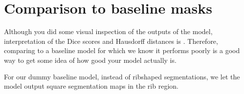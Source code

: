 \documentclass[letterpaper,10pt,english]{jupyterBook}
\begin{document}
\section{Comparison to baseline masks}
\label{\detokenize{notebooks/Tutorial3_Segmentation/Tutorial3_Segmentation_student:comparison-to-baseline-masks}}
\sphinxAtStartPar
Although you did some visual inspection of the outputs of the model, interpretation of the Dice scores and Hausdorff distances is . Therefore, comparing to a baseline model for which we know it performs poorly is a good way to get some idea of how good your model actually is.

\sphinxAtStartPar
For our dummy baseline model, instead of rib\sphinxhyphen{}shaped segmentations, we let the model output square segmentation maps in the rib region.
\end{document}
